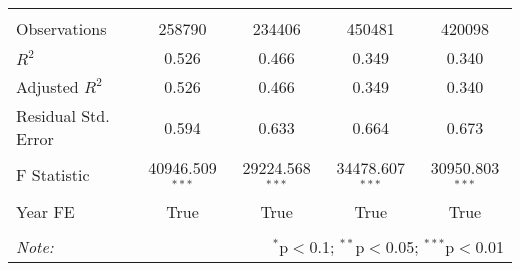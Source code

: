 \begin{tabular}{@{\extracolsep{5pt}}lcccc}
\hline \\[-1.8ex]
 Observations & 258790 & 234406 & 450481 & 420098 \\
 $R^2$ & 0.526 & 0.466 & 0.349 & 0.340 \\
 Adjusted $R^2$ & 0.526 & 0.466 & 0.349 & 0.340 \\
 Residual Std. Error & 0.594  & 0.633  & 0.664  & 0.673  \\
 F Statistic & 40946.509$^{***}$  & 29224.568$^{***}$  & 34478.607$^{***}$  & 30950.803$^{***}$  \\
    Year FE & True & True & True & True \\
\hline
\hline \\[-1.8ex]
\textit{Note:} & \multicolumn{4}{r}{$^{*}$p$<$0.1; $^{**}$p$<$0.05; $^{***}$p$<$0.01} \\
\end{tabular}
